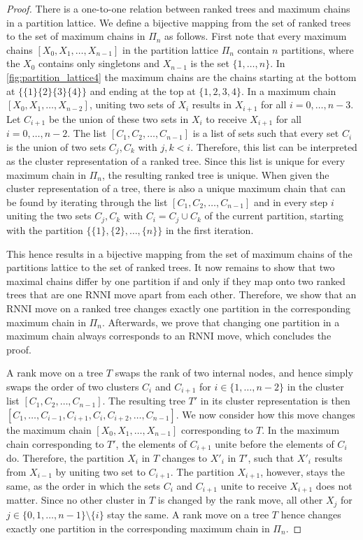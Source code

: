 \documentclass[11pt]{amsart}
\newcommand{\rnni}{\mathrm{RNNI}}
\begin{document}
\begin{proof}
	There is a one-to-one relation between ranked trees and maximum chains in a partition lattice.
	We define a bijective mapping from the set of ranked trees to the set of maximum chains in $\Pi_n$ as follows.
	First note that every maximum chains $[X_0, X_1, \ldots, X_{n-1}]$ in the partition lattice $\Pi_n$ contain $n$ partitions, where the $X_0$ contains only singletons and $X_{n-1}$ is the set $\{1, \ldots, n\}$.
	In \autoref{fig:partition_lattice4} the maximum chains are the chains starting at the bottom at $\{\{1\}\{2\}\{3\}\{4\}\}$ and ending at the top at $\{1,2,3,4\}$.
	In a maximum chain $[X_0, X_1, \ldots, X_{n-2}]$, uniting two sets of $X_i$ results in $X_{i+1}$ for all $i = 0, \ldots, n-3$.
	Let $C_{i+1}$ be the union of these two sets in $X_i$ to receive $X_{i+1}$ for all $i = 0, \ldots, n-2$.
	The list $[C_1, C_2, \ldots, C_{n-1}]$ is a list of sets such that every set $C_i$ is the union of two sets $C_j, C_k$ with $j,k < i$.
	Therefore, this list can be interpreted as the cluster representation of a ranked tree.
	Since this list is unique for every maximum chain in $\Pi_n$, the resulting ranked tree is unique.
	When given the cluster representation of a tree, there is also a unique maximum chain that can be found by iterating through the list $[C_1, C_2, \ldots, C_{n-1}]$ and in every step $i$ uniting the two sets $C_j, C_k$ with $C_i = C_j \cup C_k$ of the current partition, starting with the partition $\{\{1\},\{2\}, \ldots, \{n\}\}$ in the first iteration.

	This hence results in a bijective mapping from the set of maximum chains of the partitions lattice to the set of ranked trees.
	It now remains to show that two maximal chains differ by one partition if and only if they map onto two ranked trees that are one $\rnni$ move apart from each other.
	Therefore, we show that an $\rnni$ move on a ranked tree changes exactly one partition in the corresponding maximum chain in $\Pi_n$.
	Afterwards, we prove that changing one partition in a maximum chain always corresponds to an $\rnni$ move, which concludes the proof.

	A rank move on a tree $T$ swaps the rank of two internal nodes, and hence simply swaps the order of two clusters $C_i$ and $C_{i+1}$ for $i \in \{1, \ldots, n-2\}$ in the cluster list $[C_1, C_2, \ldots, C_{n-1}]$.
	The resulting tree $T'$ in its cluster representation is then $[C_1, \ldots, C_{i-1}, C_{i+1}, C_i, C_{i+2}, \ldots, C_{n-1}]$.
	We now consider how this move changes the maximum chain $[X_0, X_1, \ldots, X_{n-1}]$ corresponding to $T$.
	In the maximum chain corresponding to $T'$, the elements of $C_{i+1}$ unite before the elements of $C_i$ do.
	Therefore, the partition $X_{i}$ in $T$ changes to $X'_i$ in $T'$, such that $X'_i$ results from $X_{i-1}$ by uniting two set to $C_{i+1}$.
	The partition $X_{i+1}$, however, stays the same, as the order in which the sets $C_i$ and $C_{i+1}$ unite to receive $X_{i+1}$ does not matter.
	Since no other cluster in $T$ is changed by the rank move, all other $X_j$ for $j \in \{0,1,\ldots,n-1\}\setminus\{i\}$ stay the same.
	A rank move on a tree $T$ hence changes exactly one partition in the corresponding maximum chain in $\Pi_n$.


\end{proof}
\end{document}

